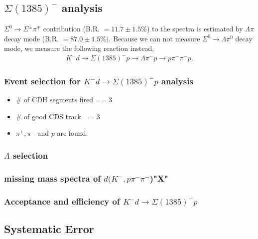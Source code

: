 \subsection{$\Sigma(1385)^{-}$ analysis}
$\Sigma^0 \rightarrow \Sigma^\pm\pi^\mp$ contribution (B.R. $=11.7 \pm 1.5 \%$) to the spectra is estimated by $\Lambda \pi$ decay mode (B.R. $=87.0 \pm 1.5 \%)$.
Because we can not measure $\Sigma^0 \rightarrow \Lambda \pi^0$ decay mode, we measure the following reaction instead,
\begin{eqnarray}
 K^-d \rightarrow \Sigma(1385)^-p \rightarrow \Lambda \pi^- p \rightarrow p\pi^-\pi^-p.
\end{eqnarray}
\subsubsection{Event selection for $K^-d \rightarrow \Sigma(1385)^-p$ analysis}
\begin{itemize}
\item \# of CDH segments fired == 3
\item \# of good CDS track == 3
\item $\pi^+,\pi^-$ and $p$ are found.
\end{itemize}

\subsubsection{$\Lambda$ selection}

\subsubsection{missing mass spectra of $d(K^-,p\pi^-\pi^-$)"X"}

\subsubsection{Acceptance and efficiency of $K^-d \rightarrow \Sigma(1385)^-p$}


\subsection{Systematic Error}



